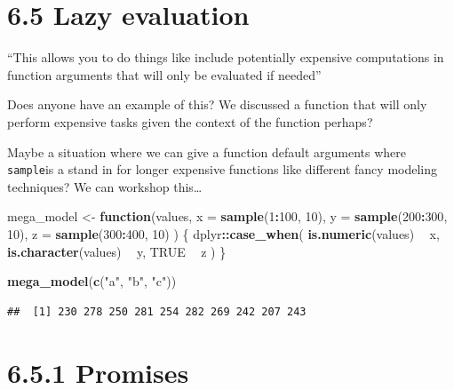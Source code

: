 \documentclass[]{book}
\newenvironment{Shaded}{\begin{snugshade}}{\end{snugshade}}
\newcommand{\ControlFlowTok}[1]{\textcolor[rgb]{0.13,0.29,0.53}{\textbf{#1}}}
\newcommand{\DataTypeTok}[1]{\textcolor[rgb]{0.13,0.29,0.53}{#1}}
\newcommand{\DecValTok}[1]{\textcolor[rgb]{0.00,0.00,0.81}{#1}}
\newcommand{\KeywordTok}[1]{\textcolor[rgb]{0.13,0.29,0.53}{\textbf{#1}}}
\newcommand{\NormalTok}[1]{#1}
\newcommand{\OperatorTok}[1]{\textcolor[rgb]{0.81,0.36,0.00}{\textbf{#1}}}
\newcommand{\OtherTok}[1]{\textcolor[rgb]{0.56,0.35,0.01}{#1}}
\newcommand{\StringTok}[1]{\textcolor[rgb]{0.31,0.60,0.02}{#1}}
\begin{document}
\hypertarget{lazy-evaluation}{%
\section*{6.5 Lazy evaluation}\label{lazy-evaluation}}

``This allows you to do things like include potentially expensive computations in function arguments that will only be evaluated if needed''

Does anyone have an example of this? We discussed a function that will only perform expensive tasks given the context of the function perhaps?

Maybe a situation where we can give a function default arguments where \texttt{sample}is a stand in for longer expensive functions like different fancy modeling techniques? We can workshop this\ldots{}

\begin{Shaded}
\begin{Highlighting}[]
\NormalTok{mega_model <-}\StringTok{ }\ControlFlowTok{function}\NormalTok{(values, }\DataTypeTok{x =} \KeywordTok{sample}\NormalTok{(}\DecValTok{1}\OperatorTok{:}\DecValTok{100}\NormalTok{, }\DecValTok{10}\NormalTok{), }\DataTypeTok{y =} \KeywordTok{sample}\NormalTok{(}\DecValTok{200}\OperatorTok{:}\DecValTok{300}\NormalTok{, }\DecValTok{10}\NormalTok{), }\DataTypeTok{z =} \KeywordTok{sample}\NormalTok{(}\DecValTok{300}\OperatorTok{:}\DecValTok{400}\NormalTok{, }\DecValTok{10}\NormalTok{)}
\NormalTok{) \{}
\NormalTok{  dplyr}\OperatorTok{::}\KeywordTok{case_when}\NormalTok{(}
    \KeywordTok{is.numeric}\NormalTok{(values) }\OperatorTok{~}\StringTok{ }\NormalTok{x,}
    \KeywordTok{is.character}\NormalTok{(values) }\OperatorTok{~}\StringTok{ }\NormalTok{y,}
    \OtherTok{TRUE} \OperatorTok{~}\StringTok{ }\NormalTok{z}
\NormalTok{  )}
\NormalTok{\}}

\KeywordTok{mega_model}\NormalTok{(}\KeywordTok{c}\NormalTok{(}\StringTok{"a"}\NormalTok{, }\StringTok{"b"}\NormalTok{, }\StringTok{"c"}\NormalTok{))}
\end{Highlighting}
\end{Shaded}

\begin{verbatim}
##  [1] 230 278 250 281 254 282 269 242 207 243
\end{verbatim}

\hypertarget{promises}{%
\section*{6.5.1 Promises}\label{promises}}
\end{document}
